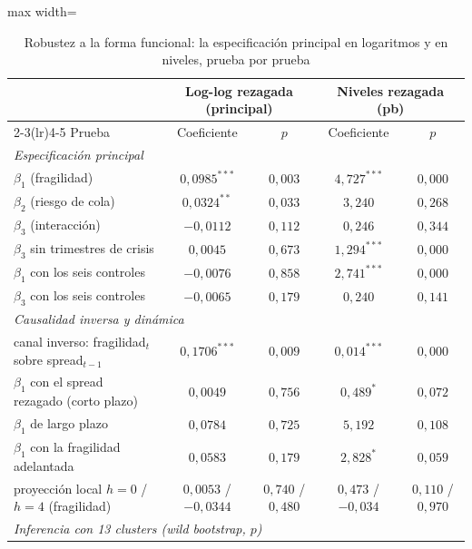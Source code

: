 \begin{table}[htbp]
\centering
\footnotesize
\setlength{\tabcolsep}{4pt}
\caption[Robustez a la forma funcional: logaritmos y niveles]{Robustez a la forma funcional: la especificación principal en logaritmos y en niveles, prueba por prueba}
\label{tab:robustez-niveles}
\begin{adjustbox}{max width=\linewidth}
\begin{tabular}{lcccc}
\toprule
 & \multicolumn{2}{c}{Log-log rezagada (principal)} & \multicolumn{2}{c}{Niveles rezagada (pb)} \\
\cmidrule(lr){2-3}\cmidrule(lr){4-5}
Prueba & Coeficiente & $p$ & Coeficiente & $p$ \\
\midrule
\multicolumn{5}{l}{\textit{Especificación principal}} \\
\quad $\beta_1$ (fragilidad) & $0{,}0985^{***}$ & $0{,}003$ & $4{,}727^{***}$ & $0{,}000$ \\
\quad $\beta_2$ (riesgo de cola) & $0{,}0324^{**}$ & $0{,}033$ & $3{,}240$ & $0{,}268$ \\
\quad $\beta_3$ (interacción) & $-0{,}0112$ & $0{,}112$ & $0{,}246$ & $0{,}344$ \\
\quad $\beta_3$ sin trimestres de crisis & $0{,}0045$ & $0{,}673$ & $1{,}294^{***}$ & $0{,}000$ \\
\quad $\beta_1$ con los seis controles & $-0{,}0076$ & $0{,}858$ & $2{,}741^{***}$ & $0{,}000$ \\
\quad $\beta_3$ con los seis controles & $-0{,}0065$ & $0{,}179$ & $0{,}240$ & $0{,}141$ \\
\multicolumn{5}{l}{\textit{Causalidad inversa y dinámica}} \\
\quad canal inverso: fragilidad$_t$ sobre spread$_{t-1}$ & $0{,}1706^{***}$ & $0{,}009$ & $0{,}014^{***}$ & $0{,}000$ \\
\quad $\beta_1$ con el spread rezagado (corto plazo) & $0{,}0049$ & $0{,}756$ & $0{,}489^{*}$ & $0{,}072$ \\
\quad $\beta_1$ de largo plazo & $0{,}0784$ & $0{,}725$ & $5{,}192$ & $0{,}108$ \\
\quad $\beta_1$ con la fragilidad adelantada & $0{,}0583$ & $0{,}179$ & $2{,}828^{*}$ & $0{,}059$ \\
\quad proyección local $h=0$ / $h=4$ (fragilidad) & $0{,}0053$ / $-0{,}0344$ & $0{,}740$ / $0{,}480$ & $0{,}473$ / $-0{,}034$ & $0{,}110$ / $0{,}970$ \\
\multicolumn{5}{l}{\textit{Inferencia con 13 \textit{clusters} (\textit{wild bootstrap}, $p$)}} \\

\end{tabular}
\end{adjustbox}
\end{table}
